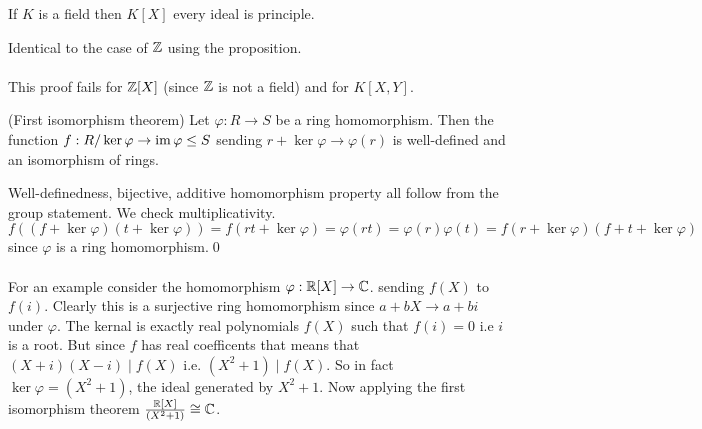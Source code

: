 \documentclass{article}
\begin{document}
\begin{itemize}
\begin{corollary}
	If $ K $ is a field then $ K[X] $ every ideal is principle.
\end{corollary}
\pf Identical to the case of $ \mathbb{Z} $ using the proposition.\\\\
This proof fails for $ \mathbb{Z} [X] $ (since $ \mathbb{Z} $ is not a field) and for $ K[X,Y] $.
\begin{theorem}
	(First isomorphism theorem) Let $ \varphi:R\to S $ be a ring homomorphism. Then the function $ f:R/\ker\varphi\to\operatorname{im}\varphi\le S $ sending $ r+\ker\varphi\to\varphi(r) $ is well-defined and an isomorphism of rings.
\end{theorem}
\pf Well-definedness, bijective, additive homomorphism property all follow from the group statement. We check multiplicativity. $ f((f+\ker\varphi)(t+\ker\varphi))=f(rt+\ker\varphi)=\varphi(rt)=\varphi(r)\varphi(t)=f(r+\ker\varphi)(f+t+\ker\varphi) $ since $ \varphi $ is a ring homomorphism.\qed
\\\\
For an example consider the homomorphism $ \varphi:\mathbb{R}[X]\to \mathbb{C} $. sending $ f(X) $ to $ f(i) $. Clearly this is a surjective ring homomorphism since $ a+bX\to a+bi $ under $ \varphi $. The kernal is exactly real polynomials $ f(X) $ such that $ f(i)=0 $ i.e $ i $ is a root. But since $ f $ has real coefficents that means that $ (X+i)(X-i)\mid f(X) $ i.e. $ (X^2+1)\mid f(X) $. So in fact $ \ker\varphi=(X^2+1) $, the ideal generated by $ X^2+1 $. Now applying the first isomorphism theorem $ \frac{\mathbb{R}[X]}{(X^2+1)}\cong \mathbb{C} $.


\end{itemize}
\end{document}
